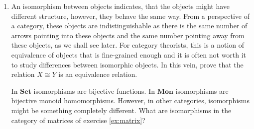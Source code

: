 \documentclass{scrartcl}
\begin{document}
\begin{enumerate}
\item
  An isomorphism between objects indicates, that the objects might
  have different structure, however, they behave the same way.  From a
  perspective of a category, these objects are indistinguishable as
  there is the same number of arrows pointing into these objects and
  the same number pointing away from these objects, as we shall see
  later.  For category theorists, this is a notion of equivalence of
  objects that is fine-grained enough and it is often not worth it to
  study differences between isomorphic objects.  In this vein, prove
  that the relation $X \cong Y$ is an equivalence relation.

  In $\mathbf{Set}$ isomorphisms are bijective functions.  In
  $\mathbf{Mon}$ isomorphisms are bijective monoid homomorphisms.
  However, in other categories, isomorphisms might be something
  completely different.  What are isomorphisms in the category of
  matrices of exercise \ref{ex:matrix}?
\end{enumerate}

\printbibliography
\end{document}
